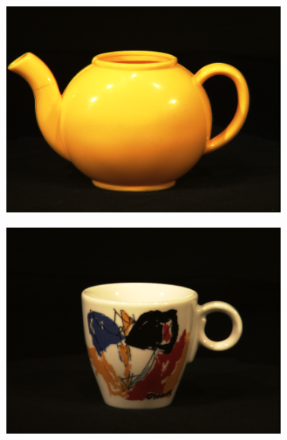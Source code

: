 \begin{figure}[tbp]
\begin{subfigure}{80pt}
    \caption{}
	\end{subfigure}
	\begin{subfigure}{80pt}
        \centering
    \includegraphics[width=\textwidth]{figures/aloi_original/161.png}
    \caption{}
	\end{subfigure}
	\begin{subfigure}{80pt}
        \centering
    \includegraphics[width=\textwidth]{figures/aloi_original/259.png}
    \caption{}
	\end{subfigure}
	\begin{subfigure}{80pt}
        \centering

\end{subfigure}
\end{figure}
